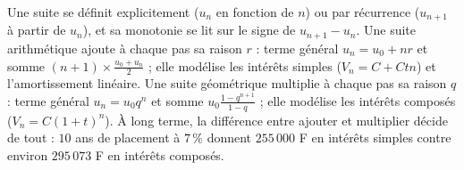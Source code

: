\begin{aretirer}
Une suite se définit explicitement ($u_{n}$ en fonction de $n$) ou par récurrence ($u_{n+1}$ à partir de $u_{n}$), et sa monotonie se lit sur le signe de $u_{n+1} - u_{n}$. Une suite arithmétique ajoute à chaque pas sa raison $r$ : terme général $u_{n} = u_{0} + nr$ et somme $(n+1) \times \frac{u_{0} + u_{n}}{2}$ ; elle modélise les intérêts simples ($V_{n} = C + Ctn$) et l'amortissement linéaire. Une suite géométrique multiplie à chaque pas sa raison $q$ : terme général $u_{n} = u_{0} q^{n}$ et somme $u_{0} \frac{1 - q^{n+1}}{1 - q}$ ; elle modélise les intérêts composés ($V_{n} = C(1+t)^{n}$). À long terme, la différence entre ajouter et multiplier décide de tout : $10$ ans de placement à $7\,\%$ donnent $255\,000$ F en intérêts simples contre environ $295\,073$ F en intérêts composés.
\end{aretirer}


